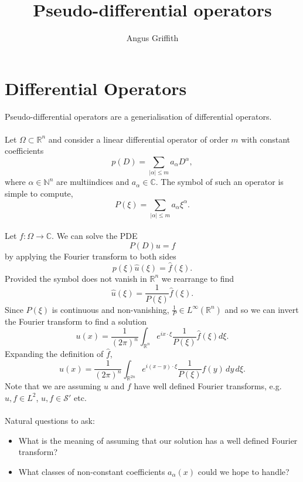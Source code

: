 \documentclass[10pt]{article}
\title{Pseudo-differential operators}
\author{Angus Griffith}
\newcommand{\R}{\mathbb{R}}
\newcommand{\C}{\mathbb{C}}
\newcommand{\N}{\mathbb{N}}
\begin{document}
\maketitle

\section{Differential Operators}
Pseudo-differential operators are a generialisation of differential operators.
\paragraph{}
Let $\Omega \subset \R^n$ and consider a linear differential operator of order $m$ with constant coefficients
\[
p(D) = \sum_{|\alpha| \le m} a_\alpha D^\alpha,
\]
where $\alpha \in \N^n$ are multiindices and $a_\alpha \in \C$.
The symbol of such an operator is simple to compute,
\[
P(\xi) = \sum_{|\alpha| \le m} a_\alpha \xi^\alpha.
\]
\paragraph{}
Let $f : \Omega \to \C$.
We can solve the PDE
\[
P(D) u = f
\]
by applying the Fourier transform to both sides
\[
p(\xi) \hat{u}(\xi) = \hat{f}(\xi).
\]
Provided the symbol does not vanish in $\R^n$ we rearrange to find
\[
\hat{u}(\xi) = \frac{1}{P(\xi)} \hat{f}(\xi).
\]
Since $P(\xi)$ is continuous and non-vanishing, $\frac{1}{P} \in L^\infty(\R^n)$ and so we can invert the Fourier transform to find a solution
\[
u(x) = \frac{1}{(2 \pi)^n} \int_{\R^n} e^{i x \cdot \xi} \frac{1}{P(\xi)} \hat{f}(\xi) d\xi.
\]
Expanding the definition of $\hat{f}$,
\[
u(x) = \frac{1}{(2 \pi)^n} \int_{\R^{2n}} e^{i (x-y) \cdot \xi} \frac{1}{P(\xi)} f(y) \, dy \, d\xi.
\]
Note that we are assuming $u$ and $f$ have well defined Fourier transforms, e.g. $u,f \in L^2$, $u,f \in \mathcal{S}'$ etc.
\paragraph{}
Natural questions to ask:
\begin{itemize}
\item What is the meaning of assuming that our solution has a well defined Fourier transform?
\item What classes of non-constant coefficients $a_\alpha(x)$ could we hope to handle?
\end{itemize}
\end{document}
